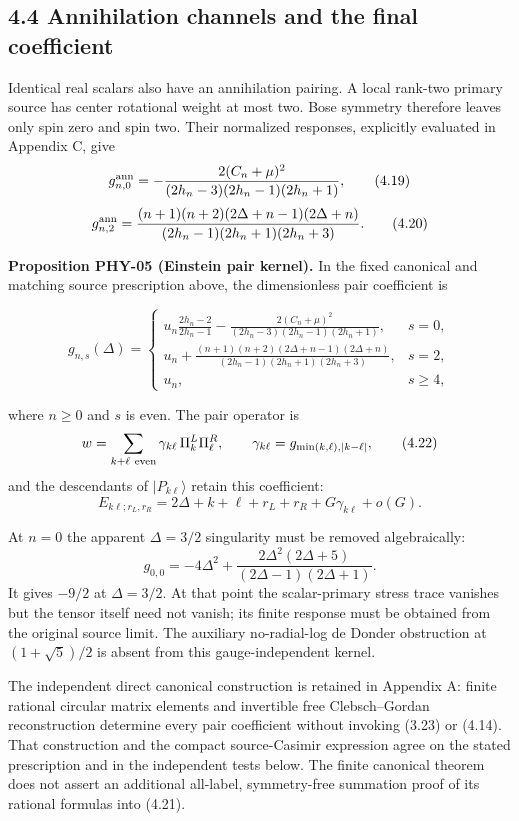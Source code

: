 \documentclass[a4paper,11pt]{article}
\numberwithin{equation}{section}
\begin{document}
\hypertarget{annihilation-channels-and-the-final-coefficient}{%
\subsection{4.4 Annihilation channels and the final coefficient}\label{annihilation-channels-and-the-final-coefficient}}

Identical real scalars also have an annihilation pairing. A local rank-two primary source has center rotational weight at most two. Bose symmetry therefore leaves only spin zero and spin two. Their normalized responses, explicitly evaluated in Appendix C, give \[
g^{\rm ann}_{n,0}
=-\frac{2(C_n+\mu)^2}
{(2h_n-3)(2h_n-1)(2h_n+1)},
\tag{4.19}
\] \[
g^{\rm ann}_{n,2}
=\frac{(n+1)(n+2)(2\Delta+n-1)(2\Delta+n)}
{(2h_n-1)(2h_n+1)(2h_n+3)} .
\tag{4.20}
\]

\textbf{Proposition PHY-05 (Einstein pair kernel).} In the fixed canonical and matching source prescription above, the dimensionless pair coefficient is

\[
\boxed{
g_{n,s}(\Delta)=
\begin{cases}
\displaystyle
u_n\frac{2h_n-2}{2h_n-1}
-\frac{2(C_n+\mu)^2}
{(2h_n-3)(2h_n-1)(2h_n+1)},&s=0,\\[2mm]
\displaystyle
u_n+
\frac{(n+1)(n+2)(2\Delta+n-1)(2\Delta+n)}
{(2h_n-1)(2h_n+1)(2h_n+3)},&s=2,\\[2mm]
u_n,&s\ge4 ,
\end{cases}
}
\tag{4.21}
\]

where \(n\ge0\) and \(s\) is even. The pair operator is \[
w=\sum_{k+\ell\ {\rm even}}
\gamma_{k\ell}\,\Pi_k^L\Pi_\ell^R,\qquad
\gamma_{k\ell}=g_{\min(k,\ell),|k-\ell|},
\tag{4.22}
\] and the descendants of \(|P_{k\ell}\rangle\) retain this coefficient: \[
E_{k\ell;r_L,r_R}
=2\Delta+k+\ell+r_L+r_R
+G\gamma_{k\ell}+o(G).
\tag{4.23}
\]

At \(n=0\) the apparent \(\Delta=3/2\) singularity must be removed algebraically: \[
g_{0,0}
=-4\Delta^2+
\frac{2\Delta^2(2\Delta+5)}
{(2\Delta-1)(2\Delta+1)} .
\tag{4.24}
\] It gives \(-9/2\) at \(\Delta=3/2\). At that point the scalar-primary stress trace vanishes but the tensor itself need not vanish; its finite response must be obtained from the original source limit. The auxiliary no-radial-log de Donder obstruction at \((1+\sqrt5)/2\) is absent from this gauge-independent kernel.

The independent direct canonical construction is retained in Appendix A: finite rational circular matrix elements and invertible free Clebsch--Gordan reconstruction determine every pair coefficient without invoking (3.23) or (4.14). That construction and the compact source-Casimir expression agree on the stated prescription and in the independent tests below. The finite canonical theorem does not assert an additional all-label, symmetry-free summation proof of its rational formulas into (4.21).
\end{document}
